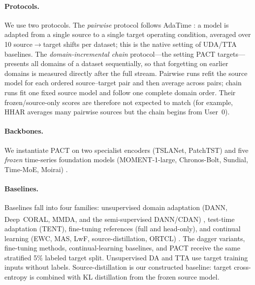 \documentclass[letterpaper]{article} %
\begin{document}
\paragraph{Protocols.}
We use two protocols. The \emph{pairwise} protocol follows
AdaTime \citep{adatime}: a model is adapted from a single source to a single target
operating condition, averaged over 10 source$\rightarrow$target shifts per
dataset; this is the native setting of UDA/TTA baselines. The
\emph{domain-incremental chain} protocol---the setting PACT
targets---presents all domains of a dataset sequentially, so that
forgetting on earlier domains is measured directly after the full stream.
Pairwise runs refit the source model for each ordered source--target pair and
then average across pairs; chain runs fit one fixed source model and follow one
complete domain order. Their frozen/source-only scores are therefore not
expected to match (for example, HHAR averages many pairwise sources but the
chain begins from User~0).

\paragraph{Backbones.}
We instantiate PACT on two specialist encoders (TSLANet, PatchTST)
\citep{eldele_tslanet_2024,nie_time_2022} and
five \emph{frozen} time-series foundation models (MOMENT-1-large,
Chronos-Bolt, Sundial, Time-MoE, Moirai)
\citep{goswami_moment_2024,ansari_chronos_2024,pmlr-v267-liu25be,shi_time-moe_2025,moirai}.

\paragraph{Baselines.}
Baselines fall into four families: unsupervised
domain adaptation (DANN, Deep~CORAL, MMDA, and the semi-supervised
DANN\textsuperscript{\dag}/CDAN\textsuperscript{\dag})
\citep{dann,deepcoral,mmda,cdan},
test-time adaptation (TENT), fine-tuning references (full and head-only),
and continual learning (EWC, MAS, LwF, source-distillation, ORTCL)
\citep{tent,ewc,mas,lwf,ortcl}. The dagger variants, fine-tuning methods,
continual-learning baselines, and PACT receive the same stratified 5\% labeled
target split. Unsupervised DA and TTA use target training inputs without labels.
Source-distillation is our constructed baseline: target cross-entropy is
combined with KL distillation from the frozen source model.
\end{document}
